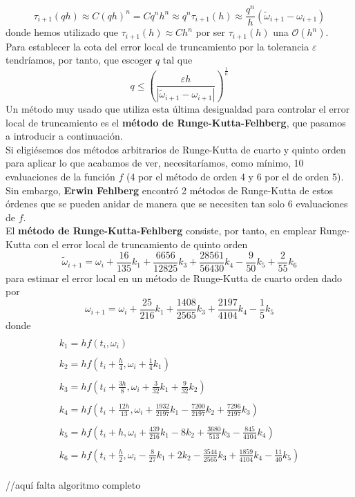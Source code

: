 $$
\tau_{i+1}(qh)\approx C(qh)^n = Cq^nh^n \approx q^n \tau_{i+1}(h) \approx \frac{q^n}{h}(\tilde{\omega}_{i+1}-\omega_{i+1}) 
$$
donde hemos utilizado que $\tau_{i+1}(h) \approx Ch^n$ por ser $\tau_{i+1}(h)$ una $\mathcal{O}(h^n)$.
\\Para establecer la cota del error local de truncamiento por la tolerancia $\varepsilon$ tendríamos, por tanto, que escoger $q$ tal que
$$
q \leq \left(\frac{\varepsilon h}{|\tilde{\omega}_{i+1} - \omega_{i+1}|}\right)^{\frac{1}{n}}
$$
Un método muy usado que utiliza esta última desigualdad para controlar el error local de truncamiento es el \textbf{método de Runge-Kutta-Felhberg}, que pasamos a introducir a continuación.\\

Si eligiésemos dos métodos arbitrarios de Runge-Kutta de cuarto y quinto orden para aplicar lo que acabamos de ver, necesitaríamos, como mínimo, 10 evaluaciones de la función $f$ (4 por el método de orden 4 y 6 por el de orden 5). Sin embargo, \textbf{Erwin Fehlberg} encontró 2 métodos de Runge-Kutta de estos órdenes que se pueden anidar de manera que se necesiten tan solo 6 evaluaciones de $f$. \\
El \textbf{método de Runge-Kutta-Fehlberg} consiste, por tanto, en emplear Runge-Kutta con el error local de truncamiento de quinto orden
$$
\tilde{\omega}_{i+1} = \omega_i + \frac{16}{135}k_1 + \frac{6656}{12825}k_3 + \frac{28561}{56430}k_4 - \frac{9}{50}k_5 + \frac{2}{55}k_6
$$
para estimar el error local en un método de Runge-Kutta de cuarto orden dado por 
$$
\omega_{i+1} = \omega_i + \frac{25}{216}k_1 + \frac{1408}{2565}k_3 + \frac{2197}{4104}k_4 - \frac{1}{5}k_5 
$$
donde 
$$
\begin{array}{l}
\\
k_1 =  hf\left(t_i, \omega_i\right)\\
\\
k_2 =  hf\left(t_i + \frac{h}{4}, \omega_i + \frac{1}{4}k_1\right)\\
\\
k_3 =  hf\left(t_i + \frac{3h}{8}, \omega_i + \frac{3}{32}k_1 +  \frac{9}{32}k_2\right)\\
\\
k_4 = hf\left(t_i + \frac{12h}{13}, \omega_i + \frac{1932}{2197}k_1 -   \frac{7200}{2197}k_2 +  \frac{7296}{2197}k_3\right) \\
\\
k_5 = hf\left(t_i + h, \omega_i + \frac{439}{216}k_1 - 8k_2 +  \frac{3680}{513}k_3 - \frac{845}{4104}k_4\right) \\
\\
k_6 = hf\left(t_i + \frac{h}{2}, \omega_i - \frac{8}{27}k_1 + 2k_2 -  \frac{3544}{2565}k_3 + \frac{1859}{4104}k_4 - \frac{11}{40}k_5\right)
\end{array}
$$
\\ //aquí falta algoritmo completo
